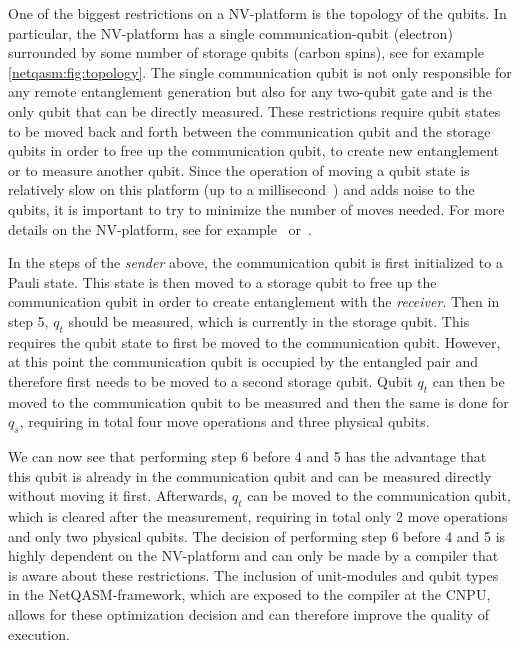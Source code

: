One of the biggest restrictions on a NV-platform is the topology of the qubits.
In particular, the NV-platform has a single communication-qubit (electron) surrounded by some number of storage qubits (carbon spins), see for example \cref{netqasm:fig:topology}.
The single communication qubit is not only responsible for any remote entanglement generation but also for any two-qubit gate and is the only qubit that can be directly measured.
These restrictions require qubit states to be moved back and forth between the communication qubit and the storage qubits in order to free up the communication qubit, to create new entanglement or to measure another qubit.
Since the operation of moving a qubit state is relatively slow on this platform (up to a millisecond~\cite{Humphreys2018}) and adds noise to the qubits, it is important to try to minimize the number of moves needed.
For more details on the NV-platform, see for example~\cite{Bernien2014} or~\cite{dahlberg2019linklayer}.

In the steps of the \textit{sender} above, the communication qubit is first initialized to a Pauli state.
This state is then moved to a storage qubit to free up the communication qubit in order to create entanglement with the \textit{receiver}.
Then in step 5, $q_t$ should be measured, which is currently in the storage qubit.
This requires the qubit state to first be moved to the communication qubit.
However, at this point the communication qubit is occupied by the entangled pair and therefore first needs to be moved to a second storage qubit.
Qubit $q_t$ can then be moved to the communication qubit to be measured and then the same is done for $q_s$, requiring in total four move operations and three physical qubits.

We can now see that performing step 6 before 4 and 5 has the advantage that this qubit is already in the communication qubit and can be measured directly without moving it first.
Afterwards, $q_t$ can be moved to the communication qubit, which is cleared after the measurement, requiring in total only 2 move operations and only two physical qubits.
The decision of performing step 6 before 4 and 5 is highly dependent on the NV-platform and can only be made by a compiler that is aware about these restrictions.
The inclusion of unit-modules and qubit types in the \ac{NetQASM}-framework, which are exposed to the compiler at the \ac{CNPU}, allows for these optimization decision and can therefore improve the quality of execution.

